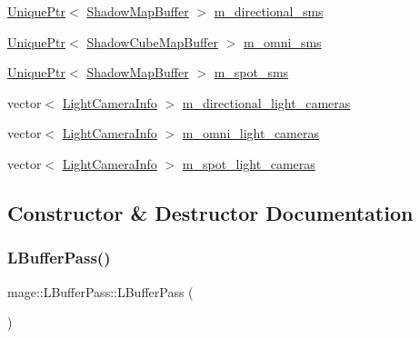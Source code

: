 \begin{DoxyCompactItemize}
\item 
\hyperlink{namespacemage_a3316d7143a973e37adf1110f2e80ca31}{Unique\+Ptr}$<$ \hyperlink{structmage_1_1_shadow_map_buffer}{Shadow\+Map\+Buffer} $>$ \hyperlink{structmage_1_1_l_buffer_pass_ab1372d2fc5e0e716565f8d3d8eb6db97}{m\+\_\+directional\+\_\+sms}
\item 
\hyperlink{namespacemage_a3316d7143a973e37adf1110f2e80ca31}{Unique\+Ptr}$<$ \hyperlink{structmage_1_1_shadow_cube_map_buffer}{Shadow\+Cube\+Map\+Buffer} $>$ \hyperlink{structmage_1_1_l_buffer_pass_a083245bbfa560e2e16fd829a30ad857d}{m\+\_\+omni\+\_\+sms}
\item 
\hyperlink{namespacemage_a3316d7143a973e37adf1110f2e80ca31}{Unique\+Ptr}$<$ \hyperlink{structmage_1_1_shadow_map_buffer}{Shadow\+Map\+Buffer} $>$ \hyperlink{structmage_1_1_l_buffer_pass_a348d64fd92b6198663494d521edcdf6b}{m\+\_\+spot\+\_\+sms}
\item 
vector$<$ \hyperlink{structmage_1_1_light_camera_info}{Light\+Camera\+Info} $>$ \hyperlink{structmage_1_1_l_buffer_pass_a42f79f890d6c6ec342f365bf974ab3a6}{m\+\_\+directional\+\_\+light\+\_\+cameras}
\item 
vector$<$ \hyperlink{structmage_1_1_light_camera_info}{Light\+Camera\+Info} $>$ \hyperlink{structmage_1_1_l_buffer_pass_ab5c839ec3dca33bde5c94d195892120e}{m\+\_\+omni\+\_\+light\+\_\+cameras}
\item 
vector$<$ \hyperlink{structmage_1_1_light_camera_info}{Light\+Camera\+Info} $>$ \hyperlink{structmage_1_1_l_buffer_pass_ae5332132d7ff616d42448c33837ba814}{m\+\_\+spot\+\_\+light\+\_\+cameras}
\end{DoxyCompactItemize}


\subsection{Constructor \& Destructor Documentation}
\hypertarget{structmage_1_1_l_buffer_pass_acde2812780af700501ca945d62ed3dcc}{}\label{structmage_1_1_l_buffer_pass_acde2812780af700501ca945d62ed3dcc} 
\subsubsection{\texorpdfstring{L\+Buffer\+Pass()}{LBufferPass()}\hspace{0.1cm}{\footnotesize\ttfamily [1/3]}}
{\footnotesize\ttfamily mage\+::\+L\+Buffer\+Pass\+::\+L\+Buffer\+Pass (\begin{DoxyParamCaption}{ }\end{DoxyParamCaption})}

